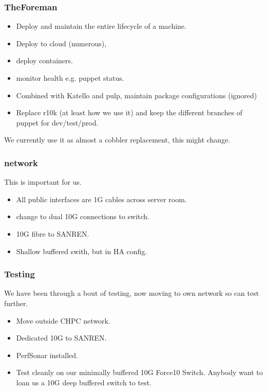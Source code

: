 \documentclass{beamer}
\begin{document}
\begin{frame}
    \frametitle{TheForeman}
    \begin{itemize}
            \item Deploy and maintain the entire lifecycle of a machine.
            \item Deploy to cloud (numerous),
                \item deploy containers.
                    \item monitor health e.g. puppet status.
                    \item Combined with Katello and pulp, maintain package configurations (ignored)
                    \item Replace r10k (at least how we use it) and keep the different branches of puppet for dev/test/prod.
    \end{itemize}
    We currently use it as almost a cobbler replacement, this might change.
\end{frame}

\begin{frame}
  \frametitle{network}
    This is \color{red}{critically} important for us.   
    \begin{itemize}
            \item All public interfaces are 1G cables across server room.
                \item change to dual 10G connections to switch.
                    \item 10G fibre to SANREN.
                        \item Shallow buffered swith, but in HA config.
    \end{itemize}
\end{frame}

\begin{frame}
    \frametitle{Testing}
    We have been through a bout of testing, now moving to own network so can test further.
    \begin{itemize}
            \item Move outside CHPC network.
    \item Dedicated 10G to SANREN.
    \item PerfSonar installed.
        \item Test cleanly on our minimally buffered 10G Force10 Switch. Anybody want to loan us a 10G deep buffered switch to test.
    \end{itemize}
    \end{frame}
\end{document}
